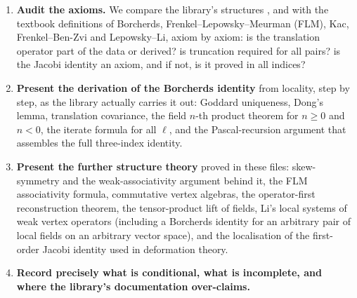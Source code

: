 \begin{enumerate}
\item \textbf{Audit the axioms.} We compare the library's structures ,
   and  with the textbook definitions of Borcherds,
  Frenkel--Lepowsky--Meurman (FLM), Kac, Frenkel--Ben-Zvi and Lepowsky--Li, axiom by axiom:
  is the translation operator part of the data or derived? is truncation required for all
  pairs? is the Jacobi identity an axiom, and if not, is it proved in all indices?
\item \textbf{Present the derivation of the Borcherds identity} from locality, step by step, as
  the library actually carries it out: Goddard uniqueness, Dong's lemma, translation covariance,
  the field $n$-th product theorem for $n\ge0$ and $n<0$, the iterate formula for all $\ell$,
  and the Pascal-recursion argument that assembles the full three-index identity.
\item \textbf{Present the further structure theory} proved in these files: skew-symmetry and the
  weak-associativity argument behind it, the FLM associativity formula, commutative vertex
  algebras, the operator-first reconstruction theorem, the tensor-product lift of fields, Li's
  local systems of weak vertex operators (including a Borcherds identity for an arbitrary pair of
  local fields on an arbitrary vector space), and the localisation of the first-order Jacobi
  identity used in deformation theory.
\item \textbf{Record precisely what is conditional, what is incomplete, and where the library's
  documentation over-claims.}
\end{enumerate}

